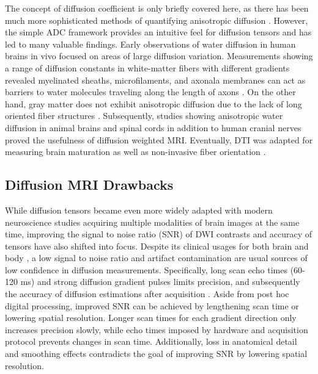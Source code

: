 The concept of diffusion coefficient is only briefly covered here, as there has been much more sophisticated methods of quantifying anisotropic diffusion \cite{basser_estimation_1994, basser_mr_1994,pierpaoli_toward_1996,ulug_orientation-independent_1999}. However, the simple ADC framework provides an intuitive feel for diffusion tensors and has led to many valuable findings. Early observations of water diffusion in human brains in vivo focused on areas of large diffusion variation. Measurements showing a range of diffusion constants in white-matter fibers with different gradients revealed myelinated sheaths, microfilaments, and axonala membranes can act as barriers to water molecules traveling along the length of axons \cite{thomsen_vivo_1987}. On the other hand, gray matter does not exhibit anisotropic diffusion due to the lack of long oriented fiber structures \cite{chenevert_anisotropic_1990, chien_mr_1990}.  Subsequently, studies showing anisotropic water diffusion in animal brains and spinal cords \cite{moseley_diffusion-weighted_1990,king_diffusion-weighted_1991,howe_magnetic_1992} in addition to human cranial nerves \cite{hajnal_mr_1991,moseley_anisotropy_1991} proved the usefulness of diffusion weighted MRI. Eventually, DTI was adapted for measuring brain maturation \cite{sakuma_adult_1991,rutherford_mr_1991} as well as non-invasive fiber orientation \cite{douek_mr_1991}. 

\subsection{Diffusion MRI Drawbacks}
While diffusion tensors became even more widely adapted with modern neuroscience studies acquiring multiple modalities of brain images at the same time, improving the signal to noise ratio (SNR) of DWI contrasts and accuracy of tensors have also shifted into focus. Despite its clinical usages for both brain \cite{moseley_diffusion-weighted_1990,warach_acute_1995} and body \cite{kiselev_fundamentals_2017,koh_diffusion-weighted_2007}, a low signal to noise ratio and artifact contamination are usual sources of low confidence in diffusion measurements. Specifically, long scan echo times (60-120 ms) and strong diffusion gradient pulses limits precision, and subsequently the accuracy of diffusion estimations after acquisition \cite{aja-fernandez_noise_2008,veraart_constrained_2011}. Aside from post hoc digital processing, improved SNR can be achieved by lengthening scan time or lowering spatial resolution. Longer scan times for each gradient direction only increases precision slowly, while echo times imposed by hardware  and acquisition protocol prevents changes in scan time. Additionally, loss in anatomical detail and smoothing effects contradicts the goal of improving SNR by lowering spatial resolution. 

